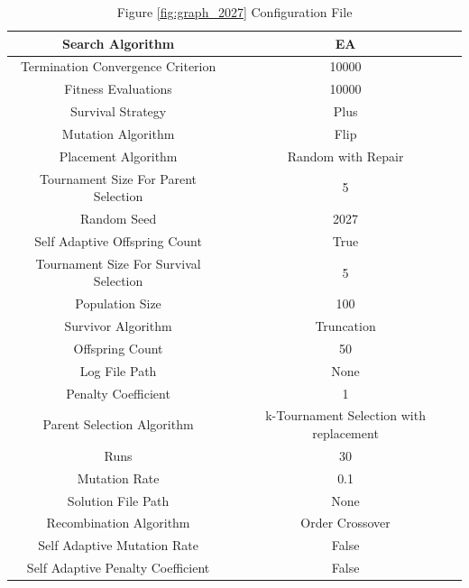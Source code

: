\documentclass{standalone}
\begin{document}
\begin{table}[!htb]
	\centering
	\caption{Figure \ref{fig:graph_2027} Configuration File}
	\label{tab:graph_2027}
	\begin{tabular}{| c | c |}
		\hline
		Search Algorithm		& EA		 \\
		\hline
		Termination Convergence Criterion		& 10000		 \\
		\hline
		Fitness Evaluations		& 10000		 \\
		\hline
		Survival Strategy		& Plus		 \\
		\hline
		Mutation Algorithm		& Flip		 \\
		\hline
		Placement Algorithm		& Random with Repair		 \\
		\hline
		Tournament Size For Parent Selection		& 5		 \\
		\hline
		Random Seed		& 2027		 \\
		\hline
		Self Adaptive Offspring Count		& True		 \\
		\hline
		Tournament Size For Survival Selection		& 5		 \\
		\hline
		Population Size		& 100		 \\
		\hline
		Survivor Algorithm		& Truncation		 \\
		\hline
		Offspring Count		& 50		 \\
		\hline
		Log File Path		& None		 \\
		\hline
		Penalty Coefficient		& 1		 \\
		\hline
		Parent Selection Algorithm		& k-Tournament Selection with replacement		 \\
		\hline
		Runs		& 30		 \\
		\hline
		Mutation Rate		& 0.1		 \\
		\hline
		Solution File Path		& None		 \\
		\hline
		Recombination Algorithm		& Order Crossover		 \\
		\hline
		Self Adaptive Mutation Rate		& False		 \\
		\hline
		Self Adaptive Penalty Coefficient		& False		 \\
		\hline
	\end{tabular}
\end{table}
\end{document}
